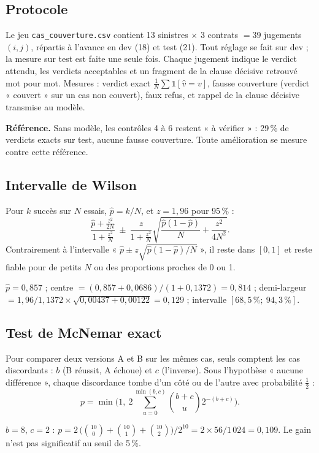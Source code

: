 \documentclass[11pt,a4paper]{article}
\begin{document}
\subsection{Protocole}
Le jeu \texttt{cas\_couverture.csv} contient 13 sinistres $\times$ 3 contrats $=39$ jugements
$(i,j)$, répartis à l'avance en dev (18) et test (21). Tout réglage se fait sur dev ; la mesure sur
test est faite une seule fois. Chaque jugement indique le verdict attendu, les verdicts acceptables et
un fragment de la clause décisive retrouvé mot pour mot. Mesures :
verdict exact $\frac{1}{N}\sum \mathbb{1}[\hat v = v]$, fausse couverture (verdict « couvert » sur
un cas non couvert), faux refus, et rappel de la clause décisive transmise au modèle.

\textbf{Référence.} Sans modèle, les contrôles 4 à 6 restent « à vérifier » : 29\,\% de verdicts
exacts sur test, aucune fausse couverture. Toute amélioration se mesure contre cette référence.

\subsection{Intervalle de Wilson}
Pour $k$ succès sur $N$ essais, $\hat p = k/N$, et $z=1{,}96$ pour 95\,\% :
\[
\frac{\hat p + \frac{z^2}{2N}}{1+\frac{z^2}{N}} \ \pm\
\frac{z}{1+\frac{z^2}{N}}\sqrt{\frac{\hat p(1-\hat p)}{N}+\frac{z^2}{4N^2}} .
\]
Contrairement à l'intervalle « $\hat p\pm z\sqrt{\hat p(1-\hat p)/N}$ », il reste dans $[0,1]$ et
reste fiable pour de petits $N$ ou des proportions proches de 0 ou 1.

\begin{exemple}[($k=24$, $N=28$)]
$\hat p = 0{,}857$ ; centre $=(0{,}857+0{,}0686)/(1+0{,}1372)=0{,}814$ ;
demi-largeur $=1{,}96/1{,}1372\times\sqrt{0{,}00437+0{,}00122}=0{,}129$ ; intervalle
$[68{,}5\,\% ;\ 94{,}3\,\%]$.
\end{exemple}

\subsection{Test de McNemar exact}
Pour comparer deux versions A et B sur les mêmes cas, seuls comptent les cas discordants :
$b$ (B réussit, A échoue) et $c$ (l'inverse). Sous l'hypothèse « aucune différence », chaque
discordance tombe d'un côté ou de l'autre avec probabilité $\frac12$ :
\[
p = \min\Big(1,\ 2\sum_{u=0}^{\min(b,c)}\binom{b+c}{u}2^{-(b+c)}\Big).
\]
\begin{exemple}
$b=8$, $c=2$ : $p = 2\,\big(\binom{10}{0}+\binom{10}{1}+\binom{10}{2}\big)/2^{10} = 2\times56/1\,024 = 0{,}109$.
Le gain n'est pas significatif au seuil de 5\,\%.
\end{exemple}
\end{document}
